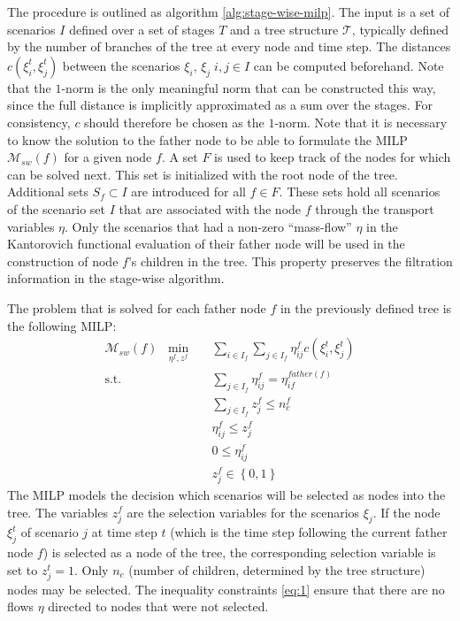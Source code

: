 The procedure is outlined as algorithm \ref{alg:stage-wise-milp}.
The input is a set of scenarios $I$ defined over a set of stages $T$ and a tree structure $\mathcal{T}$, typically defined by the number of branches of the tree at every node and time step.
The distances $c(\xi_i^t, \xi_j^t)$ between the scenarios $\xi_i,\,\xi_j\; i,j\in I$ can be computed beforehand.
Note that the $1$-norm is the only meaningful norm that can be constructed this way, since the full distance is implicitly approximated as a sum over the stages.
For consistency, $c$ should therefore be chosen as the $1$-norm.
Note that it is necessary to know the solution to the father node to be able to formulate the MILP $\mathcal{M}_{sw}(f)$ for a given node $f$.
A set $F$ is used to keep track of the nodes for which can be solved next.
This set is initialized with the root node of the tree.
Additional sets $S_f\subset I$ are introduced for all $f\in F$.
These sets hold all scenarios of the scenario set $I$ that are associated with the node $f$ through the transport variables $\eta$.
Only the scenarios that had a non-zero ``mass-flow'' $\eta$ in the Kantorovich functional evaluation of their father node will be used in the construction of node $f$'s children in the tree.
This property preserves the filtration information in the stage-wise algorithm.

The problem that is solved for each father node $f$ in the previously defined tree is the following MILP:
\begin{eqnarray} %
  \label{eq:small-milp-in-alg}
  \mathcal{M}_{sw}(f)\; \; \min_{\eta^f,z^f}&&\sum_{i\in I_f}\sum_{j\in I_f}\eta_{ij}^fc(\xi_i^t,\xi_j^t)\\
  \mathrm{s.t.}&&\sum_{j\in I_f}\eta_{ij}^f = \eta_{if}^{father(f)}\\
  &&\sum_{j\in I_f}z_j^f \leq n_c^f\\
  \label{eq:1}
  &&\eta_{ij}^f\leq z_j^f\\
  &&0\leq \eta_{ij}^f\\
  &&z_j^f\in\left\{0,1\right\}
\end{eqnarray}
The MILP models the decision which scenarios will be selected as nodes into the tree.
The variables $z_j^f$ are the selection variables for the scenarios $\xi_j$.
If the node $\xi_j^t$ of scenario $j$ at time step $t$ (which is the time step following the current father node $f$) is selected as a node of the tree, the corresponding selection variable is set to $z_j^t=1$.
Only $n_c$ (number of children, determined by the tree structure) nodes may be selected.
The inequality constraints \eqref{eq:1} ensure that there are no flows $\eta$ directed to nodes that were not selected. 

